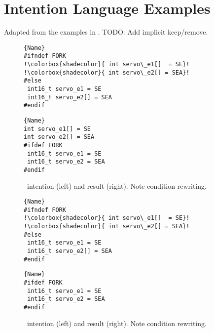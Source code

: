 \chapter{Intention Language Examples}\label{a:intentions}
Adapted from the examples in \cite{lillack2017intentions}.
TODO: Add implicit keep/remove.

\begin{figure}[ht]
    \centering
    \begin{minipage}{.35\textwidth}
\begin{lstlisting}[caption=Wrapped code by PC,escapechar=!]{Name}
#ifndef FORK
!\colorbox{shadecolor}{ int servo\_e1[]  = SE}!
!\colorbox{shadecolor}{ int servo\_e2[] = SEA}!
#else
 int16_t servo_e1 = SE
 int16_t servo_e2[] = SEA
#endif
\end{lstlisting}
\end{minipage}\qquad
\begin{minipage}{.35\textwidth}
\begin{lstlisting}[caption=Unwrapped code,escapechar=!]{Name}
int servo_e1[] = SE
int servo_e2[] = SEA
#ifdef FORK
 int16_t servo_e1 = SE
 int16_t servo_e2 = SEA
#endif
\end{lstlisting}
    \end{minipage}
    \caption{\keep~intention (left) and result (right). Note condition rewriting.}
    \label{fig:keep}
\end{figure}

\begin{figure}[ht]
    \centering
    \begin{minipage}{.35\textwidth}
\begin{lstlisting}[caption=Wrapped code by PC,escapechar=!]{Name}
#ifndef FORK
!\colorbox{shadecolor}{ int servo\_e1[]  = SE}!
!\colorbox{shadecolor}{ int servo\_e2[] = SEA}!
#else
 int16_t servo_e1 = SE
 int16_t servo_e2[] = SEA
#endif
\end{lstlisting}
\end{minipage}\qquad
\begin{minipage}{.35\textwidth}
\begin{lstlisting}[caption=Unwrapped code,escapechar=!]{Name}
#ifdef FORK
 int16_t servo_e1 = SE
 int16_t servo_e2 = SEA
#endif
\end{lstlisting}
    \end{minipage}
    \caption{\remove~intention (left) and result (right). Note condition rewriting.}
    \label{fig:remove}
\end{figure}

